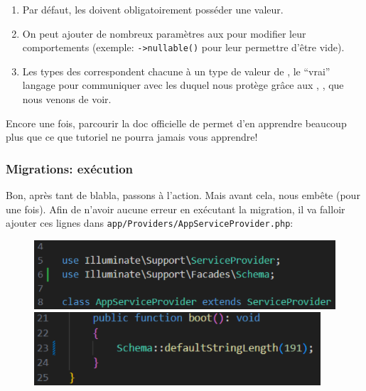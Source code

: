 \begin{enumerate}
    \item Par défaut, les \columns{} doivent obligatoirement posséder une valeur.
    \item On peut ajouter de nombreux paramètres aux \columns{} pour modifier leur comportements (exemple: \verb|->nullable()| pour leur permettre d'être vide).
    \item Les types des \column{} correspondent chacune à un type de valeur de \mysql{}, le ``vrai'' langage pour communiquer avec les \db{} duquel \laravel{} nous protège grâce aux \models{}, \migrations{}, \tables{} que nous venons de voir.
\end{enumerate}

Encore une fois, parcourir la doc officielle de \laravel{} permet d'en apprendre beaucoup plus que ce que tutoriel ne pourra jamais vous apprendre!

\subsubsection[Migrations: exécution]{Migrations: exécution}

Bon, après tant de blabla, passons à l'action. Mais avant cela, \laravel{} nous embête (pour une fois). Afin de n'avoir aucune erreur en exécutant la migration, il va falloir ajouter ces lignes dans \verb|app/Providers/AppServiceProvider.php|:

\begin{figure}[!h]
    \centering
    \begin{minipage}{0.49\textwidth}
         \centering
         \includegraphics[width=\textwidth]{figures-C1/appservice_2.pdf}
    \end{minipage}
    \begin{minipage}{0.49\textwidth}
         \centering
         \includegraphics[width=0.95\textwidth]{figures-C1/appservice_1.pdf}
    \end{minipage}
\end{figure}

